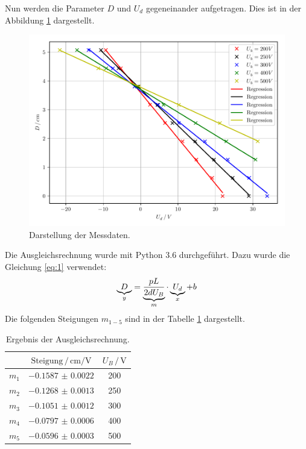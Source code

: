 Nun werden die Parameter $D$ und $U_d$ gegeneinander aufgetragen.
Dies ist in der Abbildung \ref{abb:6} dargestellt.
\begin{figure}[H]
  \centering
  \includegraphics{plot1.pdf}
  \caption{Darstellung der Messdaten.}
  \label{abb:6}
\end{figure}
Die Ausgleichsrechnung wurde mit Python 3.6 durchgeführt.
Dazu wurde die Gleichung \ref{eq:1} verwendet:
\begin{equation*}
  \underbrace{D}_{\mathclap{y}} = \underbrace{\frac{pL}{2dU_B}}_{\mathclap{m}} \cdot \underbrace{U_d}_{\mathclap{x}} + b
\end{equation*}
Die folgenden Steigungen $m_{1-5}$ sind in der Tabelle \ref{tab:2} dargestellt.

\begin{table}[H]
  \centering
  \caption{Ergebnis der Ausgleichsrechnung.}
  \label{tab:2}
  \begin{tabular}{c c c}
\toprule
&$\text{Steigung} \,/\, \si{\centi\meter\per\volt}$& $U_B \, /\, \si{\volt}$\\
\midrule
$m_1$ & $\num{-0.1587(22)}$& 200\\
$m_2$ & $\num{-0.1268(13)}$& 250\\
$m_3$ & $\num{-0.1051(12)}$& 300\\
$m_4$ & $\num{-0.0797(6)}$ & 400\\
$m_5$ & $\num{-0.0596(3)}$ & 500\\
\bottomrule
  \end{tabular}
\end{table}

